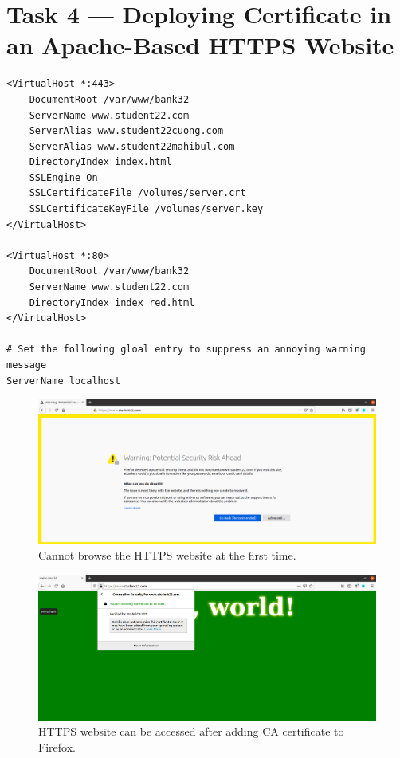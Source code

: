 \section{Task 4 --- Deploying Certificate in an Apache-Based HTTPS Website}
%
\begin{lstlisting}[caption=Content of the {\fontfamily{qcr}\selectfont
    bank32\_apache\_ssl.conf} file., label={lst:server_config}]
<VirtualHost *:443> 
    DocumentRoot /var/www/bank32
    ServerName www.student22.com
    ServerAlias www.student22cuong.com
    ServerAlias www.student22mahibul.com
    DirectoryIndex index.html
    SSLEngine On 
    SSLCertificateFile /volumes/server.crt
    SSLCertificateKeyFile /volumes/server.key
</VirtualHost>

<VirtualHost *:80> 
    DocumentRoot /var/www/bank32
    ServerName www.student22.com
    DirectoryIndex index_red.html
</VirtualHost>

# Set the following gloal entry to suppress an annoying warning message
ServerName localhost

\end{lstlisting}

\begin{figure}
    \centering
    \includegraphics[height=\textheight,width=\textwidth,keepaspectratio]
    {figures/https_do_not_work.png}
    \caption{Cannot browse the HTTPS website at the first time.}
    \label{fig:https_do_not_work}
\end{figure}

\begin{figure}
    \centering
    \includegraphics[height=\textheight,width=\textwidth,keepaspectratio]
    {figures/https_work.png}
    \caption{HTTPS website can be accessed after adding CA certificate to Firefox.}
    \label{fig:https_work}
\end{figure}


